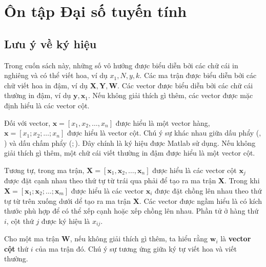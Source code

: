 \chapter{Ôn tập Đại số tuyến tính}
\label{cha:linearalgebra}

\section{Lưu ý về ký hiệu}

Trong cuốn sách này, những số vô hướng được biểu diễn bởi các chữ cái
in nghiêng và có thể viết hoa, ví dụ $x_1, N, y, k$. Các ma trận được biểu diễn
bởi các chữ viết hoa in đậm, ví dụ $\mathbf{X, Y, W} $. Các vector được biểu
diễn bởi các chữ cái thường in đậm, ví dụ $\mathbf{y}, \mathbf{x}_1 $. Nếu
không giải thích gì thêm, các vector được mặc định hiểu là các vector cột.

Đối với vector, $\mathbf{x} = [x_1, x_2, \dots, x_n]$ được hiểu là một vector
hàng, $\mathbf{x} = [x_1; x_2; \dots; x_n] $ được hiểu là vector cột. Chú ý
sự khác nhau giữa dấu phẩy ($,$) và dấu chấm phẩy ($;$). Đây chính là ký hiệu
được Matlab sử dụng. Nếu không giải thích gì thêm, một chữ cái viết thường in
đậm được hiểu là một vector cột.

Tương tự, trong ma trận, $\mathbf{X} = [\mathbf{x}_1, \mathbf{x}_2, \dots,
\mathbf{x}_n]$ được hiểu là các vector cột $\mathbf{x}_j$ được đặt cạnh nhau
theo thứ tự từ trái qua phải để tạo ra ma trận $\mathbf{X}$. Trong khi
$\mathbf{X} = [\mathbf{x}_1; \mathbf{x}_2; \dots; \mathbf{x}_m]$ được hiểu là
các vector $\mathbf{x}_i$ được đặt chồng lên nhau theo thứ tự từ trên xuống dưới
dể tạo ra ma trận $\mathbf{X}$. Các vector được ngầm hiểu là có kích thước phù
hợp để có thể xếp cạnh hoặc xếp chồng lên nhau. Phần tử ở hàng thứ $i$, cột thứ
$j$ được ký hiệu là $x_{ij}$.


Cho một ma trận $\mathbf{W}$, nếu không giải thích gì thêm, ta hiểu rằng
$\mathbf{w}_i$ là \textbf{vector cột} thứ $i$ của ma trận đó. Chú ý sự tương ứng
giữa ký tự viết hoa và viết thường.


